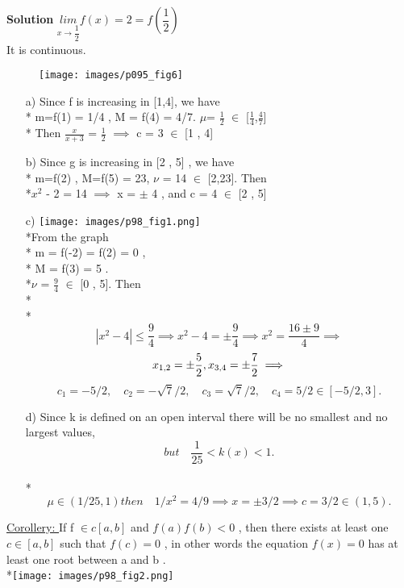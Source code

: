 \documentclass[11pt]{amsbook}
\begin{document}
\textbf{Solution}
$ \underset{x \rightarrow \dfrac{1}{2}}{lim}  f(x) = 2 = f(\dfrac{1}{2})  $ \\
It is continuous.
\begin{figure}[h]
\texttt{[image: images/p095\_fig6]}
\caption{       }
\label{fig:p095_fig6}
\end{figure} 
\begin{enumerate}
\item[a)] 
Since f is increasing in [1,4], we have 
 \\* m=f(1) = 1/4 , M = f(4) = 4/7.  $\mu$= $\frac{1}{2}$ $\in$ [$\frac{1}{4}$,$\frac{4}{7}$]
\\* Then $\frac{x}{x+3}$ = $\frac{1}{2}$ $\implies$  c = 3 $\in$ [1 , 4]

\item[b)] 
Since g is increasing in [2 , 5] , we have
\\* m=f(2) , M=f(5) = 23, $\nu$ = 14 $\in$ [2,23]. Then
\\*$ x^2$ - 2 = 14 $\implies$ x = $\pm$ 4 , and c = 4 $\in$ [2 , 5]
\item[c)]
\texttt{[image: images/p98\_fig1.png]}
\\*From the graph
\\* m = f(-2) = f(2) = 0 ,
\\* M = f(3) = 5 .
\\*$\nu$ = $\frac{9}{4}$ $\in$ [0 , 5].   Then
\\*
\\* \[
|x^2-4| \leq \frac{9}{4} \implies x^2 - 4 = \pm \frac{9}{4}  \implies x^2 = \frac{16 \pm 9}{4}\implies
\]
\[
\\* x_{1,2} = \pm \frac{5}{2} , x_{3,4} = \pm \frac{7}{2}  \implies
\]
\[ c_{1} = - 5/2 , \quad  c_{2} = -\sqrt{7}/2 , \quad   c_{3} = \sqrt{7}/2 , \quad    c_{4} = 5/2 \in [-5/2 , 3] .
\]
\item[d)] 
Since k is defined on an open interval there will be no smallest and no largest values,
\quad \[    but \quad  \frac{1}{25} < k(x) < 1 . 
\]
\\*
\[ \mu \in (1/25 , 1) then \quad 1/x^2 = 4/9 \implies x= \pm 3/2 \implies c=3/2 \in (1,5).
\] 

\end{enumerate} 

\underline{Corollery: } If f $\in c[a,b]$  and $f(a) f(b)< 0 $ , then there exists at least one $ c \in [a, b]$ such that $f(c) = 0$ , 
in other words the equation $ f(x) = 0$ has at least one root between a  and b .
\\*\texttt{[image: images/p98\_fig2.png]}
\end{document}
